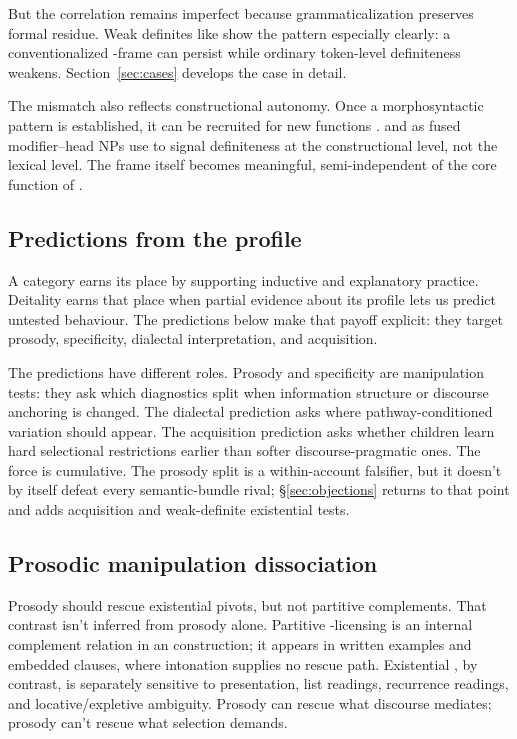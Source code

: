 \documentclass[12pt,letterpaper]{article}
\begin{document}
But the correlation remains imperfect because grammaticalization preserves formal residue. Weak definites like  show the pattern especially clearly: a conventionalized -frame can persist while ordinary token-level definiteness weakens. Section~\ref{sec:cases} develops the case in detail.

The mismatch also reflects constructional autonomy. Once a morphosyntactic pattern is established, it can be recruited for new functions \parencite{FrancisMichaelis2003}.  and  as fused modifier--head NPs use  to signal definiteness at the constructional level, not the lexical level. The frame itself becomes meaningful, semi-independent of the core function of .

\subsection{Predictions from the profile}

A category earns its place by supporting inductive and explanatory practice. Deitality earns that place when partial evidence about its profile lets us predict untested behaviour. The predictions below make that payoff explicit: they target prosody, specificity, dialectal interpretation, and acquisition.

The predictions have different roles. Prosody and specificity are manipulation tests: they ask which diagnostics split when information structure or discourse anchoring is changed. The dialectal prediction asks where pathway-conditioned variation should appear. The acquisition prediction asks whether children learn hard selectional restrictions earlier than softer discourse-pragmatic ones. The force is cumulative. The prosody split is a within-account falsifier, but it doesn't by itself defeat every semantic-bundle rival; §\ref{sec:objections} returns to that point and adds acquisition and weak-definite existential tests.

\subsection{Prosodic manipulation dissociation}\label{sec:prosody}

Prosody should rescue existential pivots, but not partitive  complements. That contrast isn't inferred from prosody alone. Partitive -licensing is an internal complement relation in an  construction; it appears in written examples and embedded clauses, where intonation supplies no rescue path. Existential , by contrast, is separately sensitive to presentation, list readings, recurrence readings, and locative/expletive ambiguity. Prosody can rescue what discourse mediates; prosody can't rescue what selection demands.
\end{document}
